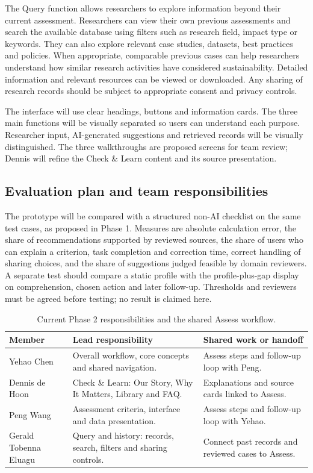 \documentclass[11pt,a4paper]{article}
\begin{document}
The Query function allows researchers to explore information beyond their current assessment. Researchers can view their own previous assessments and search the available database using filters such as research field, impact type or keywords. They can also explore relevant case studies, datasets, best practices and policies. When appropriate, comparable previous cases can help researchers understand how similar research activities have considered sustainability. Detailed information and relevant resources can be viewed or downloaded. Any sharing of research records should be subject to appropriate consent and privacy controls.

The interface will use clear headings, buttons and information cards. The three main functions will be visually separated so users can understand each purpose. Researcher input, AI-generated suggestions and retrieved records will be visually distinguished. The three walkthroughs are proposed screens for team review; Dennis will refine the Check \& Learn content and its source presentation.


\subsection{Evaluation plan and team responsibilities}
The prototype will be compared with a structured non-AI checklist on the same test cases, as proposed in Phase 1. Measures are absolute calculation error, the share of recommendations supported by reviewed sources, the share of users who can explain a criterion, task completion and correction time, correct handling of sharing choices, and the share of suggestions judged feasible by domain reviewers. A separate test should compare a static profile with the profile-plus-gap display on comprehension, chosen action and later follow-up. Thresholds and reviewers must be agreed before testing; no result is claimed here.
\begin{table}[H]
\centering\small
\begin{tabularx}{\textwidth}{@{}>{\raggedright\arraybackslash}p{}>{\raggedright\arraybackslash}p{}X@{}}
\toprule
Member & Lead responsibility & Shared work or handoff \\
\midrule
Yehao Chen & Overall workflow, core concepts and shared navigation. & Assess steps and follow-up loop with Peng. \\
Dennis de Hoon & Check \& Learn: Our Story, Why It Matters, Library and FAQ. & Explanations and source cards linked to Assess. \\
Peng Wang & Assessment criteria, interface and data presentation. & Assess steps and follow-up loop with Yehao. \\
Gerald Tobenna Eluagu & Query and history: records, search, filters and sharing controls. & Connect past records and reviewed cases to Assess. \\
\bottomrule
\end{tabularx}
\caption{Current Phase 2 responsibilities and the shared Assess workflow.}
\label{tab:phase2-owners}
\end{table}
\end{document}
